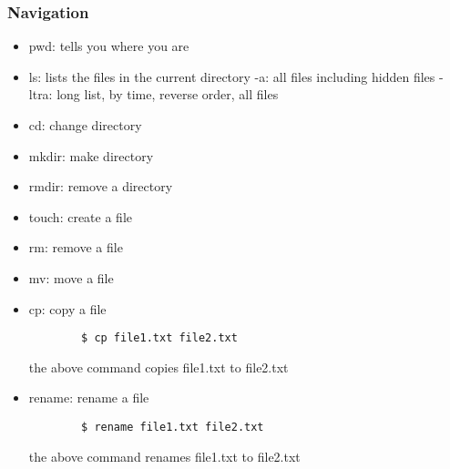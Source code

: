 \documentclass[12pt,a4paper]{article}
\begin{document}
\subsubsection{Navigation}
\begin{itemize}
    \item pwd: tells you where you are
    \item ls: lists the files in the current directory
    -a: all files including hidden files
    -ltra: long list, by time, reverse order, all files
    \item cd: change directory
    \item mkdir: make directory
    \item rmdir: remove a directory
    \item touch: create a file
    \item rm: remove a file
    \item mv: move a file
    \item cp: copy a file\\
    \begin{lstlisting}
        $ cp file1.txt file2.txt
    \end{lstlisting}
    the above command copies file1.txt to file2.txt
    \item rename: rename a file
    \begin{lstlisting}
        $ rename file1.txt file2.txt
    \end{lstlisting}
    the above command renames file1.txt to file2.txt
\end{itemize}
\end{document}
